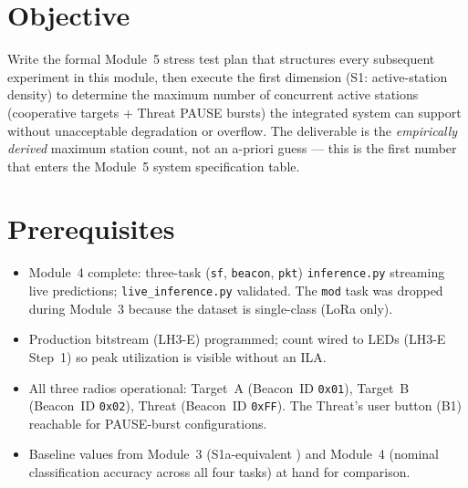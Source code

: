 \documentclass[11pt,letterpaper]{article}
\begin{document}

\section{Objective}
Write the formal Module~5 stress test plan that structures every subsequent experiment in this module, then execute the first dimension (S1: active-station density) to determine the maximum number of concurrent active stations (cooperative targets + Threat PAUSE bursts) the integrated system can support without unacceptable \PER{} degradation or \FIFO{} overflow. The deliverable is the \emph{empirically derived} maximum station count, not an a-priori guess --- this is the first number that enters the Module~5 system specification table.

\section{Prerequisites}
\begin{itemize}[leftmargin=2em]
	\item Module~4 complete: three-task (\texttt{sf}, \texttt{beacon}, \texttt{pkt}) \texttt{inference.py} streaming live predictions; \texttt{live\_inference.py} validated. The \texttt{mod} task was dropped during Module~3 because the dataset is single-class (LoRa only).
	\item Production bitstream (LH3-E) programmed; \FIFO{} count wired to \mbox{LEDs{}} (LH3-E Step~1) so peak \FIFO{} utilization is visible without an \mbox{ILA{}}.
	\item All three radios operational: Target~A (Beacon~ID \texttt{0x01}), Target~B (Beacon~ID \texttt{0x02}), Threat (Beacon~ID \texttt{0xFF}). The Threat's user button (B1) reachable for PAUSE-burst configurations.
	\item Baseline values from Module~3 (S1a-equivalent \PER{}) and Module~4 (nominal classification accuracy across all four tasks) at hand for comparison.
\end{itemize}
\end{document}
